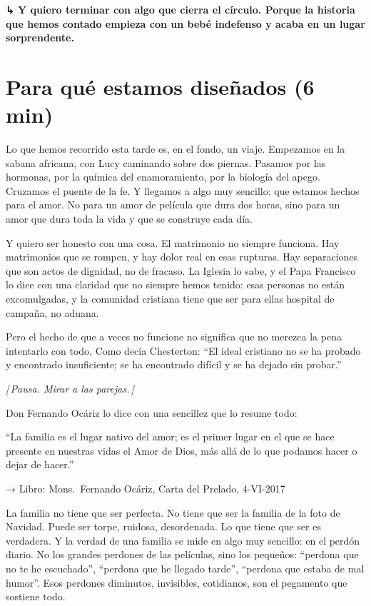 \documentclass[a4paper, 11pt]{article}
\newcommand{\reflibro}[1]{%
  {\small\sffamily\color{gris} → Libro: #1}%
}
\newcommand{\nota}[1]{%
  \par\smallskip
  {\small\itshape\color{oro!80!black} [\,#1\,]}%
  \par\smallskip
}
\newcommand{\transicion}[1]{%
  \par\medskip
  {\sffamily\color{gris}\bfseries ↳ #1}%
  \par\medskip
}
\begin{document}
\transicion{Y quiero terminar con algo que cierra el círculo. Porque la historia que hemos contado empieza con un bebé indefenso y acaba en un lugar sorprendente.}

\section{Para qué estamos diseñados (6 min)}

Lo que hemos recorrido esta tarde es, en el fondo, un viaje. Empezamos en la sabana africana, con Lucy caminando sobre dos piernas. Pasamos por las hormonas, por la química del enamoramiento, por la biología del apego. Cruzamos el puente de la fe. Y llegamos a algo muy sencillo: que estamos hechos para el amor. No para un amor de película que dura dos horas, sino para un amor que dura toda la vida y que se construye cada día.

Y quiero ser honesto con una cosa. El matrimonio no siempre funciona. Hay matrimonios que se rompen, y hay dolor real en esas rupturas. Hay separaciones que son actos de dignidad, no de fracaso. La Iglesia lo sabe, y el Papa Francisco lo dice con una claridad que no siempre hemos tenido: esas personas no están excomulgadas, y la comunidad cristiana tiene que ser para ellas hospital de campaña, no aduana.

Pero el hecho de que a veces no funcione no significa que no merezca la pena intentarlo con todo. Como decía Chesterton: ``El ideal cristiano no se ha probado y encontrado insuficiente; se ha encontrado difícil y se ha dejado sin probar.''

\nota{Pausa. Mirar a las parejas.}

Don Fernando Ocáriz lo dice con una sencillez que lo resume todo:

\begin{citalibro}
``La familia es el lugar nativo del amor; es el primer lugar en el que se hace presente en nuestras vidas el Amor de Dios, más allá de lo que podamos hacer o dejar de hacer.''
\end{citalibro}
\reflibro{Mons.\ Fernando Ocáriz, Carta del Prelado, 4-VI-2017}

La familia no tiene que ser perfecta. No tiene que ser la familia de la foto de Navidad. Puede ser torpe, ruidosa, desordenada. Lo que tiene que ser es verdadera. Y la verdad de una familia se mide en algo muy sencillo: en el perdón diario. No los grandes perdones de las películas, sino los pequeños: ``perdona que no te he escuchado'', ``perdona que he llegado tarde'', ``perdona que estaba de mal humor''. Esos perdones diminutos, invisibles, cotidianos, son el pegamento que sostiene todo.
\end{document}
